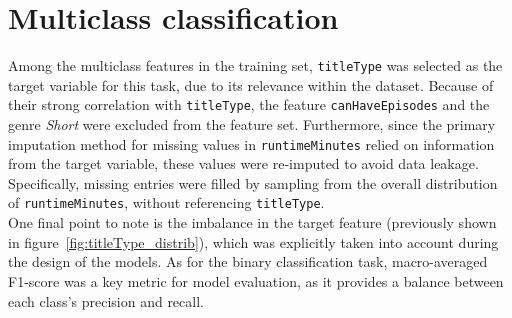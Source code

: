 




\section{Multiclass classification}\label{sec:multiclass_classification}
Among the multiclass features in the training set, \texttt{titleType} was selected as the target variable
for this task, due to its relevance within the dataset. Because of their strong correlation with
\texttt{titleType}, the feature \texttt{canHaveEpisodes} and the genre \textit{Short} were excluded from the
feature set. Furthermore, since the primary imputation method for missing values in \texttt{runtimeMinutes}
relied on information from the target variable, these values were re-imputed to avoid data leakage.
Specifically, missing entries were filled by sampling from the overall distribution of
\texttt{runtimeMinutes}, without referencing \texttt{titleType}.\\

One final point to note is the imbalance in the target feature (previously shown in
figure~\ref{fig:titleType_distrib}), which was explicitly taken into account
during the design of the models. As for the binary classification task, macro-averaged F1-score was
a key metric for model evaluation, as it provides a balance between each class's precision and recall.



